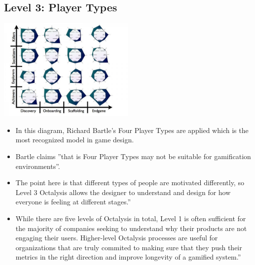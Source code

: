 \subsection{Level 3: Player Types}
\begin{center}
    \includegraphics[width=0.5\textwidth]{images/Gamification-Octalysis.020.jpg}
\end{center}
\begin{itemize}
    \item In this diagram, Richard Bartle's Four Player Types are applied which is the most recognized model in game design.
    \item Bartle claims ''that is Four Player Types may not be suitable for gamification environments''.
    \item The point here is that different types of people are motivated differently, so Level 3 Octalysis allows the designer to understand and design for how everyone is feeling at different stages.''
    \item While there are five levels of Octalysis in total, Level 1 is often sufficient for the majority of companies seeking to understand why their products are not engaging their users. Higher-level Octalysis processes are useful for organizations that are truly commited to making sure that they push their metrics in the right direction and improve longevity of a gamified system.'' 
\end{itemize}